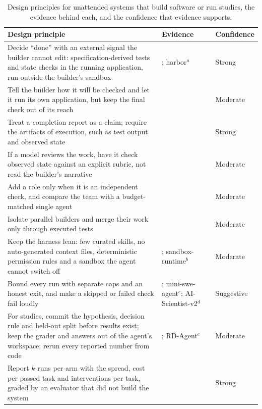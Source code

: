 \begin{table}[t]
\centering
\footnotesize
\caption{Design principles for unattended systems that build software or run studies, the evidence behind each, and the confidence that evidence supports.}
\label{tab:design}
\begin{tabularx}{\linewidth}{@{}>{\raggedright\arraybackslash}X>{\raggedright\arraybackslash}p{4.2cm}l@{}}
\toprule
Design principle & Evidence & Confidence \\
\midrule
Decide ``done'' with an external signal the builder cannot edit: specification-derived tests and state checks in the running application, run outside the builder's sandbox & \citep{V2,V28,C12}; harbor$^{a}$ & Strong \\
\addlinespace
Tell the builder how it will be checked and let it run its own application, but keep the final check out of its reach & \citep{C29,C9,C19,V3} & Moderate \\
\addlinespace
Treat a completion report as a claim; require the artifacts of execution, such as test output and observed state & \citep{T23,F20,F25} & Strong \\
\addlinespace
If a model reviews the work, have it check observed state against an explicit rubric, not read the builder's narrative & \citep{T18,V24,V29,V15} & Moderate \\
\addlinespace
Add a role only when it is an independent check, and compare the team with a budget-matched single agent & \citep{T18,T25,T9,T4,T6} & Moderate \\
\addlinespace
Isolate parallel builders and merge their work only through executed tests & \citep{T20,T22,T19} & Moderate \\
\addlinespace
Keep the harness lean: few curated skills, no auto-generated context files, deterministic permission rules and a sandbox the agent cannot switch off & \citep{H6,H1,H8,H17}; sandbox-runtime$^{b}$ & Moderate \\
\addlinespace
Bound every run with separate caps and an honest exit, and make a skipped or failed check fail loudly & \citep{V3,S19}; mini-swe-agent$^{c}$; AI-Scientist-v2$^{d}$ & Suggestive \\
\addlinespace
For studies, commit the hypothesis, decision rule and held-out split before results exist; keep the grader and answers out of the agent's workspace; rerun every reported number from code & \citep{R19,R6,R26,S15}; RD-Agent$^{e}$ & Moderate \\
\addlinespace
Report $k$ runs per arm with the spread, cost per passed task and interventions per task, graded by an evaluator that did not build the system & \citep{F19,F24,F8,F32} & Strong \\

\end{tabularx}
\end{table}
